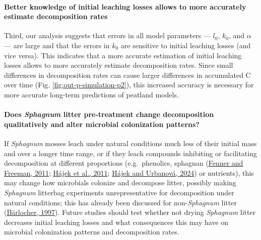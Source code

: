 \documentclass[
  12pt,
]{article}
\begin{document}
\hypertarget{better-knowledge-of-initial-leaching-losses-allows-to-more-accurately-estimate-decomposition-rates}{%
\paragraph*{Better knowledge of initial leaching losses allows to more accurately estimate decomposition rates}\label{better-knowledge-of-initial-leaching-losses-allows-to-more-accurately-estimate-decomposition-rates}}

Third, our analysis suggests that errors in all model parameters --- \(l_0\), \(k_0\), and \(\alpha\) --- are large and that the errors in \(k_0\) are sensitive to initial leaching losses (and vice versa). This indicates that a more accurate estimation of initial leaching losses allows to more accurately estimate decomposition rates. Since small differences in decomposition rates can cause larger differences in accumulated C over time (Fig. \ref{fig:out-p-simulation-p2}), this increased accuracy is necessary for more accurate long-term predictions of peatland models.

\hypertarget{does-sphagnum-litter-pre-treatment-change-decomposition-qualitatively-and-alter-microbial-colonization-patterns}{%
\paragraph*{\texorpdfstring{Does \emph{Sphagnum} litter pre-treatment change decomposition qualitatively and alter microbial colonization patterns?}{Does Sphagnum litter pre-treatment change decomposition qualitatively and alter microbial colonization patterns?}}\label{does-sphagnum-litter-pre-treatment-change-decomposition-qualitatively-and-alter-microbial-colonization-patterns}}

If \emph{Sphagnum} mosses leach under natural conditions much less of their initial mass and over a longer time range, or if they leach compounds inhibiting or facilitating decomposition at different proportions (e.g.~phenolics, sphagnan (\protect\hyperlink{ref-Fenner.2011}{Fenner and Freeman, 2011}; \protect\hyperlink{ref-Hajek.2011}{Hájek et al., 2011}; \protect\hyperlink{ref-Hajek.2024}{Hájek and Urbanová, 2024}) or nutrients), this may change how microbials colonize and decompose litter, possibly making \emph{Sphagnum} litterbag experiments unrepresentative for decomposition under natural conditions; this has already been discussed for non-\emph{Sphagnum} litter (\protect\hyperlink{ref-Barlocher.1997}{Bärlocher, 1997}). Future studies should test whether not drying \emph{Sphagnum} litter decreases initial leaching losses and what consequences this may have on microbial colonization patterns and decomposition rates.
\end{document}
